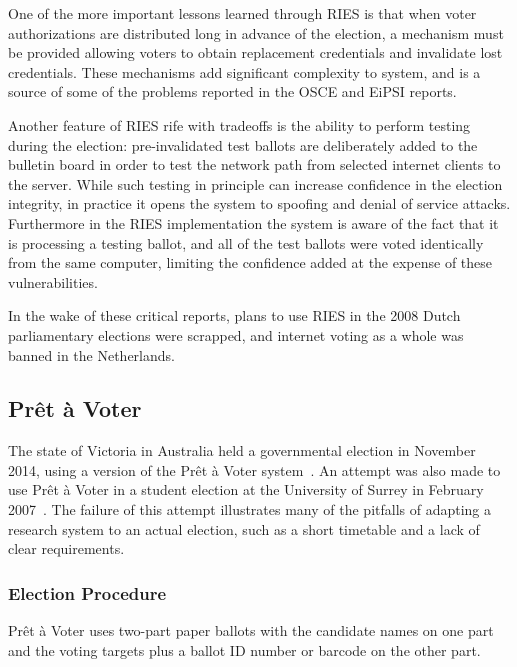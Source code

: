 One of the more important lessons learned through RIES is that when
voter authorizations are distributed long in advance of the election,
a mechanism must be provided allowing voters to obtain replacement
credentials and invalidate lost credentials. These mechanisms add
significant complexity to system, and is a source of some of the
problems reported in the OSCE and EiPSI reports.

Another feature of RIES rife with tradeoffs is the ability to perform
testing during the election: pre-invalidated test ballots are
deliberately added to the bulletin board in order to test the network
path from selected internet clients to the server. While such testing
in principle can increase confidence in the election integrity, in
practice it opens the system to spoofing and denial of service
attacks. Furthermore in the RIES implementation the system is aware of
the fact that it is processing a testing ballot, and all of the test
ballots were voted identically from the same computer, limiting the
confidence added at the expense of these vulnerabilities.

In the wake of these critical reports, plans to use RIES in the 2008
Dutch parliamentary elections were scrapped, and internet voting as a
whole was banned in the Netherlands.

\subsection{Prêt à Voter~\cite{chaum2005}}

The state of Victoria in Australia held a governmental election in
November 2014, using a version of the Prêt à Voter
system~\cite{burton2012}. An attempt was also made to use Prêt à Voter
in a student election at the University of Surrey in February
2007~\cite{bismark2007}. The failure of this attempt illustrates many
of the pitfalls of adapting a research system to an actual election,
such as a short timetable and a lack of clear requirements.

\subsubsection{Election Procedure}

Prêt à Voter uses two-part paper ballots with the candidate names on
one part and the voting targets plus a ballot ID number or barcode on
the other part.

